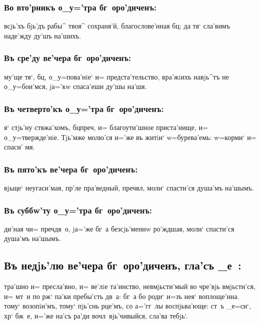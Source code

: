 \documentclass[14pt,twoside]{extreport}
\renewcommand{\*}{~~\raise3pt\hbox{\footnotesize*}}
\begin{document}
\subsubsection{Во вто'рникъ о_у='тра бг~оро'диченъ:}

 всjь'хъ бjь'дъ рабы^ твоя^ сохраня'й, благослове'нная бц: да тя`
сла'вимъ наде'жду ду'шъ на'шихъ.

\subsubsection{Въ сре'ду ве'чера бг~оро'диченъ:}

му'ще тя`, бц, о_у=пова'нiе` и= предста'тельство, вра'жiихъ
навjь^тъ не о_у=бои'мся, jа='кw спаса'еши ду'шы на'шя.

\subsubsection{Въ четверто'къ о_у='тра бг~оро'диченъ:}

я` стjь'ну стяжа'хомъ, бц преч, и= благоути'шное приста'нище,
и= о_у=твержде'нiе. Тjь'мже молю'ся и='же въ житiи` w=бурева'емь: w=корми` и=
спаси' мя.

\subsubsection{Въ пято'къ ве'чера бг~оро'диченъ:}

вjьще` неугаси'мая, пр'ле пра'ведный, пре\-ч вл, моли`
спасти'ся душа'мъ на'шымъ.

\subsubsection{Въ суббw'ту о_у='тра бг~оро'диченъ:}

ди'ная ч и= преч дв~о, jа='же бг~а безсjь'меннw ро'ждшая,
моли` спасти'ся душа'мъ на'\-шымъ.

\delimpict

\subsection[Гла'съ _е~]{Въ недjь'лю ве'чера бг~оро'диченъ, гла'съ _е~:}

тра'шно и= пресла'вно, и= ве'лiе та'инство, невмjьсти'мый во чре'вjь
вмjьсти'ся, и= мт~и по рж` па'ки пребы'сть дв~а: бг~а бо роди` и=зъ нея`
воплоще'нна. тому` возопiи'мъ, тому` пjь'снь рце'мъ, со а='гг~лы воспjьва'юще:
ст~ъ _е=си`, хр` бж~е, и='же на'съ ра'ди вочл~вjь'чивыйся, сла'ва тебjь`.
\end{document}

